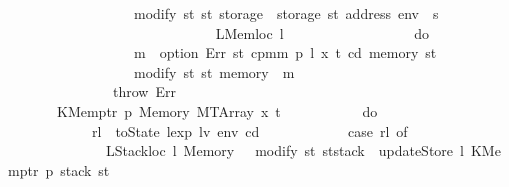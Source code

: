 \begin{isabellebody}
\ \ \ \ \ \ \ \ \ \ \ \ \ \ \ \ \ \ modify\ {\isacharparenleft}{\kern0pt}{\isasymlambda}st{\isachardot}{\kern0pt}\ st\ {\isasymlparr}storage\ {\isacharcolon}{\kern0pt}{\isacharequal}{\kern0pt}\ {\isacharparenleft}{\kern0pt}storage\ st{\isacharparenright}{\kern0pt}\ {\isacharparenleft}{\kern0pt}address\ env\ {\isacharcolon}{\kern0pt}{\isacharequal}{\kern0pt}\ s{\isacharparenright}{\kern0pt}{\isasymrparr}{\isacharparenright}{\kern0pt}\isanewline
\ \ \ \ \ \ \ \ \ \ \ \ \ \ \ \ {\isacharbraceright}{\kern0pt}\isanewline
\ \ \ \ \ \ \ \ \ \ \ \ {\isacharbar}{\kern0pt}\ {\isacharparenleft}{\kern0pt}LMemloc\ l{\isacharcomma}{\kern0pt}\ {\isacharunderscore}{\kern0pt}{\isacharparenright}{\kern0pt}\ {\isasymRightarrow}\isanewline
\ \ \ \ \ \ \ \ \ \ \ \ \ \ \ \ do\ {\isacharbraceleft}{\kern0pt}\isanewline
\ \ \ \ \ \ \ \ \ \ \ \ \ \ \ \ \ \ m\ {\isasymleftarrow}\ option\ Err\ {\isacharparenleft}{\kern0pt}{\isasymlambda}st{\isachardot}{\kern0pt}\ cpm{}m\ p\ l\ x\ t\ cd\ {\isacharparenleft}{\kern0pt}memory\ st{\isacharparenright}{\kern0pt}{\isacharparenright}{\kern0pt}{\isacharsemicolon}{\kern0pt}\isanewline
\ \ \ \ \ \ \ \ \ \ \ \ \ \ \ \ \ \ modify\ {\isacharparenleft}{\kern0pt}{\isasymlambda}st{\isachardot}{\kern0pt}\ st\ {\isasymlparr}memory\ {\isacharcolon}{\kern0pt}{\isacharequal}{\kern0pt}\ m{\isasymrparr}{\isacharparenright}{\kern0pt}\isanewline
\ \ \ \ \ \ \ \ \ \ \ \ \ \ \ \ {\isacharbraceright}{\kern0pt}\isanewline
\ \ \ \ \ \ \ \ \ \ \ \ {\isacharbar}{\kern0pt}\ {\isacharunderscore}{\kern0pt}\ {\isasymRightarrow}\ throw\ Err\isanewline
\ \ \ \ \ \ \ \ \ \ {\isacharbraceright}{\kern0pt}\isanewline
\ \ \ \ \ \ {\isacharbar}{\kern0pt}\ {\isacharparenleft}{\kern0pt}KMemptr\ p{\isacharcomma}{\kern0pt}\ Memory\ {\isacharparenleft}{\kern0pt}MTArray\ x\ t{\isacharparenright}{\kern0pt}{\isacharparenright}{\kern0pt}\ {\isasymRightarrow}\isanewline
\ \ \ \ \ \ \ \ \ \ do\ {\isacharbraceleft}{\kern0pt}\isanewline
\ \ \ \ \ \ \ \ \ \ \ \ rl\ {\isasymleftarrow}\ toState\ {\isacharparenleft}{\kern0pt}lexp\ lv\ env\ cd{\isacharparenright}{\kern0pt}{\isacharsemicolon}{\kern0pt}\isanewline
\ \ \ \ \ \ \ \ \ \ \ \ case\ rl\ of\isanewline
\ \ \ \ \ \ \ \ \ \ \ \ \ \ {\isacharparenleft}{\kern0pt}LStackloc\ l{\isacharcomma}{\kern0pt}\ Memory\ {\isacharunderscore}{\kern0pt}{\isacharparenright}{\kern0pt}\ {\isasymRightarrow}\ modify\ {\isacharparenleft}{\kern0pt}{\isasymlambda}st{\isachardot}{\kern0pt}\ st{\isasymlparr}stack\ {\isacharcolon}{\kern0pt}{\isacharequal}{\kern0pt}\ updateStore\ l\ {\isacharparenleft}{\kern0pt}KMemptr\ p{\isacharparenright}{\kern0pt}\ {\isacharparenleft}{\kern0pt}stack\ st{\isacharparenright}{\kern0pt}{\isasymrparr}{\isacharparenright}{\kern0pt}\isanewline

\end{isabellebody}
